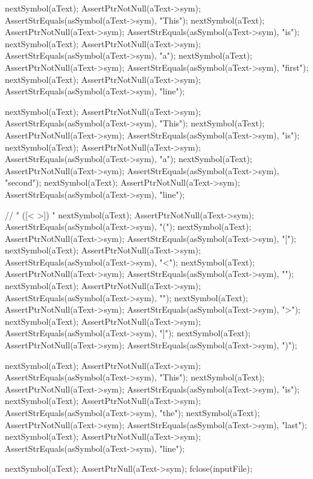   nextSymbol(aText);
  AssertPtrNotNull(aText->sym);
  AssertStrEquals(asSymbol(aText->sym), "This");
  nextSymbol(aText);
  AssertPtrNotNull(aText->sym);
  AssertStrEquals(asSymbol(aText->sym), "is");
  nextSymbol(aText);
  AssertPtrNotNull(aText->sym);
  AssertStrEquals(asSymbol(aText->sym), "a");
  nextSymbol(aText);
  AssertPtrNotNull(aText->sym);
  AssertStrEquals(asSymbol(aText->sym), "first");
  nextSymbol(aText);
  AssertPtrNotNull(aText->sym);
  AssertStrEquals(asSymbol(aText->sym), "line");

  nextSymbol(aText);
  AssertPtrNotNull(aText->sym);
  AssertStrEquals(asSymbol(aText->sym), "This");
  nextSymbol(aText);
  AssertPtrNotNull(aText->sym);
  AssertStrEquals(asSymbol(aText->sym), "is");
  nextSymbol(aText);
  AssertPtrNotNull(aText->sym);
  AssertStrEquals(asSymbol(aText->sym), "a");
  nextSymbol(aText);
  AssertPtrNotNull(aText->sym);
  AssertStrEquals(asSymbol(aText->sym), "second");
  nextSymbol(aText);
  AssertPtrNotNull(aText->sym);
  AssertStrEquals(asSymbol(aText->sym), "line");

  // " ([<{ }>]) "
  nextSymbol(aText);
  AssertPtrNotNull(aText->sym);
  AssertStrEquals(asSymbol(aText->sym), "(");
  nextSymbol(aText);
  AssertPtrNotNull(aText->sym);
  AssertStrEquals(asSymbol(aText->sym), "[");
  nextSymbol(aText);
  AssertPtrNotNull(aText->sym);
  AssertStrEquals(asSymbol(aText->sym), "<");
  nextSymbol(aText);
  AssertPtrNotNull(aText->sym);
  AssertStrEquals(asSymbol(aText->sym), "{");
  nextSymbol(aText);
  AssertPtrNotNull(aText->sym);
  AssertStrEquals(asSymbol(aText->sym), "}");
  nextSymbol(aText);
  AssertPtrNotNull(aText->sym);
  AssertStrEquals(asSymbol(aText->sym), ">");
  nextSymbol(aText);
  AssertPtrNotNull(aText->sym);
  AssertStrEquals(asSymbol(aText->sym), "]");
  nextSymbol(aText);
  AssertPtrNotNull(aText->sym);
  AssertStrEquals(asSymbol(aText->sym), ")");

  nextSymbol(aText);
  AssertPtrNotNull(aText->sym);
  AssertStrEquals(asSymbol(aText->sym), "This");
  nextSymbol(aText);
  AssertPtrNotNull(aText->sym);
  AssertStrEquals(asSymbol(aText->sym), "is");
  nextSymbol(aText);
  AssertPtrNotNull(aText->sym);
  AssertStrEquals(asSymbol(aText->sym), "the");
  nextSymbol(aText);
  AssertPtrNotNull(aText->sym);
  AssertStrEquals(asSymbol(aText->sym), "last");
  nextSymbol(aText);
  AssertPtrNotNull(aText->sym);
  AssertStrEquals(asSymbol(aText->sym), "line");

  nextSymbol(aText);
  AssertPtrNull(aText->sym);
  fclose(inputFile);
\stopCTest
\stopTestCase
\stopTestSuite
